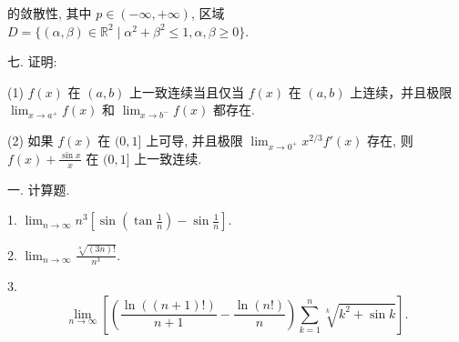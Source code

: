 \documentclass{examcollection}
\renewcommand{\displayformula}[1]{\[#1\]}
\begin{document}
{\begin{minipage}{\textwidth}
的敛散性, 其中 $p \in (-\infty, +\infty)$, 区域 $D = \{(\alpha, \beta) \in \mathbb{R}^2 \mid \alpha^2 + \beta^2 \leq 1, \alpha, \beta \geq 0\}$.\par
七. 证明:\par
(1) $f(x)$ 在 $(a, b)$ 上一致连续当且仅当 $f(x)$ 在 $(a, b)$ 上连续，并且极限 $\lim_{x \to a^{+}} f(x)$ 和 $\lim_{x \to b^{-}} f(x)$ 都存在.\par
(2) 如果 $f(x)$ 在 $(0,1]$ 上可导, 并且极限 $\lim_{x\to 0^{+}}x^{2 / 3}f'(x)$ 存在, 则 $f(x) + \frac{\sin x}{x}$ 在 $(0,1]$ 上一致连续.\par
{}\smallskip
一. 计算题.\par
1. $\lim_{n\to \infty}n^3\left[\sin \left(\tan \frac{1}{n}\right) - \sin \frac{1}{n}\right].$\par
2.  $\lim_{n\to\infty}\frac{\sqrt[n]{(3n)!}}{n^{3}}.$\par
3. \displayformula{\lim _ {n \rightarrow \infty} \left[\left(\frac {\ln ((n + 1) !)}{n + 1} - \frac {\ln (n !)}{n}\right) \sum_ {k = 1} ^ {n} \sqrt [ k ]{k ^ {2} + \sin k} \right].}\par
\end{minipage}}
\ifdim\dimexpr\ht\proofbox+\dp\proofbox\relax>\textheight
\noindent\resizebox{!}{\textheight}{\usebox{\proofbox}}\else\noindent\usebox{\proofbox}\fi\clearpage
\end{document}
